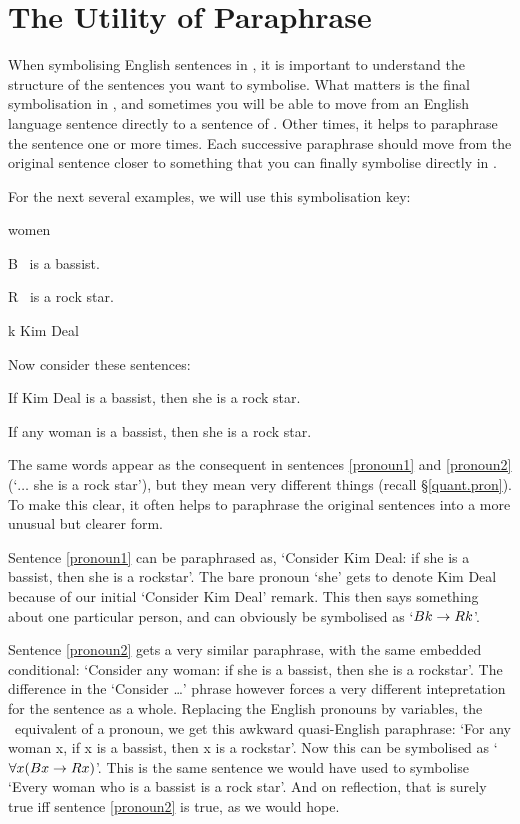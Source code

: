\section{The Utility of Paraphrase}
When symbolising English sentences in \FOL, it is important to understand the structure of the sentences you want to symbolise. What matters is the final symbolisation in \FOL, and sometimes you will be able to move from an English language sentence directly to a sentence of \FOL. Other times, it helps to paraphrase the sentence one or more times. Each successive paraphrase should move from the original sentence closer to something that you can finally symbolise directly in \FOL.

For the next several examples, we will use this symbolisation key:
	\begin{ekey}
		\item[\domain] women
		\item[B] \blank\ is a bassist.
		\item[R] \blank\ is a rock star.
		\item[k] Kim Deal
	\end{ekey}
Now consider these sentences:
	\begin{earg}
		\item[\ex{pronoun1}] If Kim Deal is a bassist, then she is a rock star.
		\item[\ex{pronoun2}] If any woman is a bassist, then she is a rock star.
	\end{earg}
The same words appear as the consequent in sentences \ref{pronoun1} and \ref{pronoun2} (`$…$ she is a rock star'), but they mean very different things (recall §\ref{quant.pron}). To make this clear, it often helps to paraphrase the original sentences into a more unusual but clearer form.

Sentence \ref{pronoun1} can be paraphrased as, `Consider Kim Deal: if she is a bassist, then she is a rockstar'. The bare pronoun `she' gets to denote Kim Deal because of our initial `Consider Kim Deal' remark. This then says something about one particular person, and can obviously be symbolised as `$Bk \rightarrow Rk$'.

Sentence \ref{pronoun2} gets a very similar paraphrase, with the same embedded conditional: `Consider any woman: if she is a bassist, then she is a rockstar'. The difference in the `Consider …' phrase however forces a very different intepretation for the sentence as a whole. Replacing the English pronouns by variables, the \FOL\ equivalent of a pronoun, we get this awkward quasi-English paraphrase: `For any woman x, if x is a bassist, then x is a rockstar'. Now this can be symbolised as `$\forall x (Bx \rightarrow Rx)$'. This is the same sentence we would have used to symbolise `Every woman who is a bassist is a rock star'. And on reflection, that is surely true iff sentence \ref{pronoun2} is true, as we would hope.

